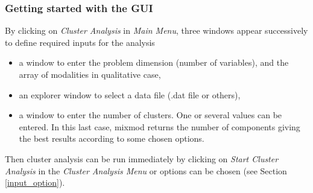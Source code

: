 \subsubsection{Getting started with the GUI}


By clicking on {\em Cluster Analysis} in {\em Main Menu}, three windows appear
successively to define required inputs for the analysis
\begin{itemize}
  \item a window to enter the problem dimension (number of variables), and the array of modalities in
        qualitative case,

  \item an explorer window to select a data file (.dat file or others),

  \item a window to enter the number of clusters. One or several values can be entered. In this last case, {\sc
  mixmod} returns the number of components giving the best results according to some chosen options.
\end{itemize}


Then cluster analysis can be run immediately by clicking
on {\em Start Cluster Analysis} in the {\em Cluster
Analysis Menu} or options can be chosen (see Section \ref{input_option}).\\

